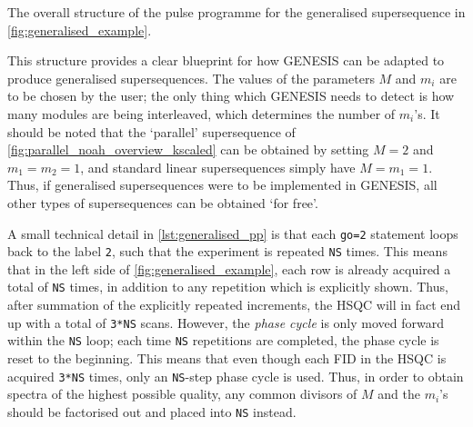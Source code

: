 \begin{mylisting}[!htbp] %
    \caption[Structure of pulse programme for generalised supersequences]{
        The overall structure of the pulse programme for the generalised supersequence in \cref{fig:generalised_example}.
    }
    \label{lst:generalised_pp}
\end{mylisting} %

This structure provides a clear blueprint for how GENESIS can be adapted to produce generalised supersequences.
The values of the parameters $M$ and $m_i$ are to be chosen by the user; the only thing which GENESIS needs to detect is how many modules are being interleaved, which determines the number of $m_i$'s.
It should be noted that the `parallel' supersequence of \cref{fig:parallel_noah_overview_kscaled} can be obtained by setting $M = 2$ and $m_1 = m_2 = 1$, and standard linear supersequences simply have $M = m_1 = 1$.
Thus, if generalised supersequences were to be implemented in GENESIS, all other types of supersequences can be obtained `for free'.

A small technical detail in \cref{lst:generalised_pp} is that each \texttt{go=2} statement loops back to the label \texttt{2}, such that the experiment is repeated \texttt{NS} times.
This means that in the left side of \cref{fig:generalised_example}, each row is already acquired a total of \texttt{NS} times, in addition to any repetition which is explicitly shown.
Thus, after summation of the explicitly repeated increments, the HSQC will in fact end up with a total of \texttt{3*NS} scans.
However, the \textit{phase cycle} is only moved forward within the \texttt{NS} loop; each time \texttt{NS} repetitions are completed, the phase cycle is reset to the beginning.
This means that even though each FID in the HSQC is acquired \texttt{3*NS} times, only an \texttt{NS}-step phase cycle is used.
Thus, in order to obtain spectra of the highest possible quality, any common divisors of $M$ and the $m_i$'s should be factorised out and placed into \texttt{NS} instead.



